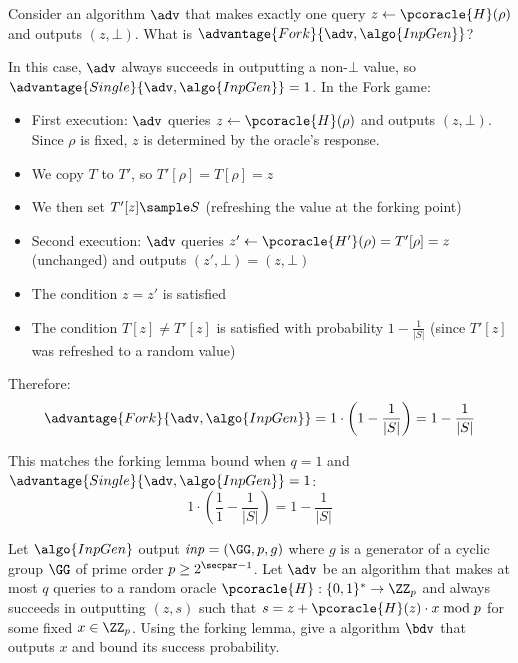 \begin{exercise}
  Consider an algorithm $\adv$ that makes exactly one query $z \gets \pcoracle{H}(\rho)$ and outputs $(z, \bot)$. What is $\advantage{Fork}{\adv, \algo{InpGen}}$?
\end{exercise}

\ifsolutions
\begin{mysolution}
  In this case, $\adv$ always succeeds in outputting a non-$\bot$ value, so $\advantage{Single}{\adv, \algo{InpGen}} = 1$. In the Fork game:
  
  \begin{itemize}
    \item First execution: $\adv$ queries $z \gets \pcoracle{H}(\rho)$ and outputs $(z, \bot)$. Since $\rho$ is fixed, $z$ is determined by the oracle's response.
    \item We copy $T$ to $T'$, so $T'[\rho] = T[\rho] = z$
    \item We then set $T'[z] \sample S$ (refreshing the value at the forking point)
    \item Second execution: $\adv$ queries $z' \gets \pcoracle{H'}(\rho) = T'[\rho] = z$ (unchanged) and outputs $(z', \bot) = (z, \bot)$
    \item The condition $z = z'$ is satisfied
    \item The condition $T[z] \neq T'[z]$ is satisfied with probability $1 - \frac{1}{|S|}$ (since $T'[z]$ was refreshed to a random value)
  \end{itemize}
  
  Therefore:
  \[
  \advantage{Fork}{\adv, \algo{InpGen}} = 1 \cdot \left(1 - \frac{1}{|S|}\right) = 1 - \frac{1}{|S|}
  \]
  
  This matches the forking lemma bound when $q = 1$ and $\advantage{Single}{\adv, \algo{InpGen}} = 1$:
  \[
  1 \cdot \left(\frac{1}{1} - \frac{1}{|S|}\right) = 1 - \frac{1}{|S|}
  \]
\end{mysolution}
\fi


\begin{exercise}
  Let $\algo{InpGen}$ output $\mathit{inp} = (\GG,p,g)$ where $g$ is a generator of a cyclic group $\GG$ of prime order $p \geq 2^{\secpar-1}$.
  Let $\adv$ be an algorithm that makes at most $q$ queries to a random oracle $\pcoracle{H}: \{0,1\}^* \rightarrow \ZZ_p$ and always succeeds in outputting $(z, s)$ such that $s = z + \pcoracle{H}(z) \cdot x \bmod p$ for some fixed $x \in \ZZ_p$.
  Using the forking lemma, give a \ppt algorithm $\bdv$ that outputs $x$ and bound its success probability.
\end{exercise}


